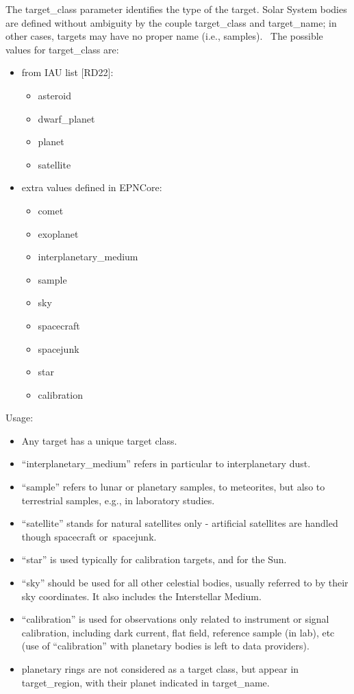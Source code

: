 \documentclass[11pt,a4paper]{ivoa}
\begin{document}
The target\_class parameter identifies the type of the target. Solar System bodies are defined without ambiguity by the couple target\_class and target\_name; in other cases, targets may have no proper name (i.e., samples).  The possible values for target\_class are:

\begin{itemize}
\item from IAU list [RD22]:\begin{itemize}
\item asteroid
\item dwarf\_planet
\item planet
\item satellite
\end{itemize}


\item extra values defined in EPNCore:\begin{itemize}
\item comet
\item exoplanet
\item interplanetary\_medium
\item sample
\item sky
\item spacecraft
\item spacejunk
\item star
\item calibration
\end{itemize}


\end{itemize}

Usage:

\begin{itemize}
\item Any target has a unique target class.
\item ``interplanetary\_medium'' refers in particular to interplanetary dust.
\item ``sample'' refers to lunar or planetary samples, to meteorites, but also to terrestrial samples, e.g., in laboratory studies.
\item ``satellite'' stands for natural satellites only - artificial satellites are handled though spacecraft or spacejunk.
\item ``star'' is used typically for calibration targets, and for the Sun.
\item ``sky'' should be used for all other celestial bodies, usually referred to by their sky coordinates. It also includes the Interstellar Medium.
\item ``calibration'' is used for observations only related to instrument or signal calibration, including dark current, flat field, reference sample (in lab), etc (use of ``calibration'' with planetary bodies is left to data providers).
\item planetary rings are not considered as a target class, but appear in target\_region, with their planet indicated in target\_name.
\end{itemize}
\end{document}
